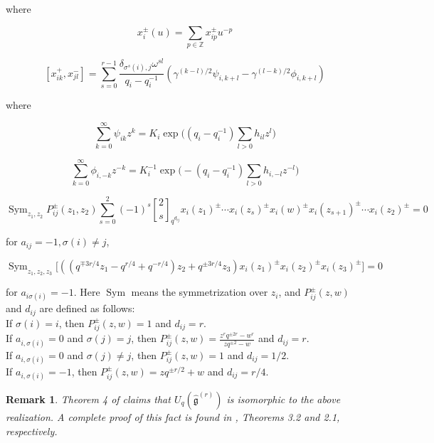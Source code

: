 \documentclass[12pt]{amsart}
\newtheorem{rem}[thm]{Remark}
\numberwithin{equation}{section}
\newcommand{\Z}{\ensuremath{\mathbb{Z}}}
\newcommand{\g}{\ensuremath{\mathfrak{g}}}
\newcommand{\Sym}{\operatorname{Sym}}
\begin{document}
where 

$$ x_{i}^{\pm }(u) = \sum_{p \in \Z} x_{ip}^{\pm}u^{-p} $$

\begin{equation}\label{Comnx^+x^-} [x_{ik}^{+}, x_{jl}^{-}] = \sum_{s=0}^{r-1}\frac{\delta_{\sigma^s(i),j}\omega^{sl}}{q_i - q_i^{-1}}(\gamma^{(k-l)/2}\psi_{i,k+l} - \gamma^{(l-k)/2}\phi_{i,k+l})  \end{equation}

where

$$ \sum_{k=0}^{\infty} \psi_{ik}z^ k = K_i\exp\Big((q_i-q_i^{-1})\sum_{l>0}h_{il}z^l\Big) $$

$$ \sum_{k=0}^{\infty} \phi_{i,-k}z^{-k} = K_i^{-1}\exp\Big(-(q_i-q_i^{-1})\sum_{l>0}h_{i,-l}z^{-l}\Big) $$

$$ \Sym_{z_1, z_2} P_{ij}^{\pm}(z_1, z_2) \sum_{s=0}^{2}(-1)^s{2 \brack s}_{q^{d_{ij}}} x_{i}(z_1)^{\pm} \cdots x_{i}(z_s)^{\pm}x_{i}(w)^{\pm}x_{i}(z_{s+1})^{\pm} \cdots x_{i}(z_2)^{\pm} = 0$$ 

for $a_{ij} = -1, \sigma(i) \neq j$,

$$ \Sym_{z_1, z_2, z_3} \big[ ((q^{\mp 3r/4}z_1 - q^{r/4} + q^{-r/4})z_2 + q^{\pm 3r/4}z_3 )x_{i}(z_1)^{\pm}x_{i}(z_2)^{\pm}x_{i}(z_3)^{\pm} \big] =0$$

\vspace{3mm}

for $a_{i\sigma(i)} = -1$. Here $\Sym$ means the symmetrization over $z_i$, and $P_{ij}^{\pm}(z,w)$ and $d_{ij}$ are defined as follows:\\

If $\sigma(i)=i$, then $P_{ij}^{\pm}(z,w) = 1$ and $d_{ij} = r$. \\

If $a_{i,\sigma(i)}=0$ and $\sigma(j)=j$, then $P_{ij}^{\pm}(z,w) = \frac{z^rq^{\pm 2r} - w^r}{zq^{\pm 2} - w}$ and $d_{ij} = r$.\\

If $a_{i,\sigma(i)}=0$ and $\sigma(j)\neq j$, then $P_{ij}^{\pm}(z,w) = 1$ and $d_{ij} = 1/2$.\\

If $a_{i,\sigma(i)}=-1$, then $P_{ij}^{\pm}(z,w) = zq^{\pm r/2} + w$ and $d_{ij} = r/4$.\\

\begin{rem}
   Theorem 4 of \cite{D01} claims that $U_q(\hat{\g}^{(r)})$ is isomorphic to the above realization. A complete proof of this fact is found in \cite{J, JM}, Theorems 3.2 and 2.1, respectively. 
\end{rem}
\end{document}
